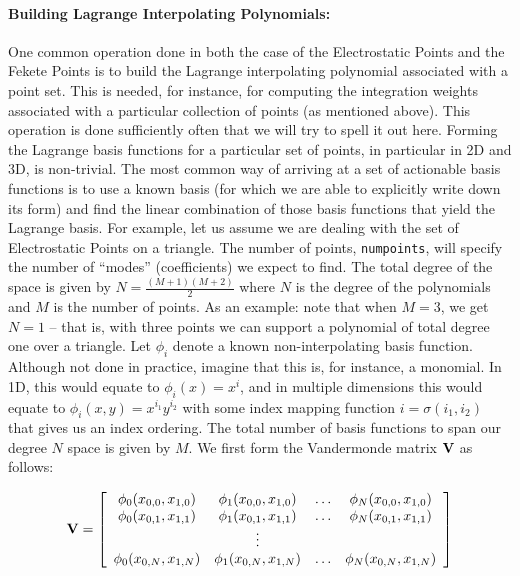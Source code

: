 \paragraph{Building Lagrange Interpolating Polynomials: }
One common operation done in both the case of the Electrostatic Points and the Fekete Points is to build the
Lagrange interpolating polynomial associated with a point set.  This is needed, for instance, for computing the integration
weights associated with a particular collection of points (as mentioned above).  This 
operation is done sufficiently often that we will try to spell it out here.  Forming the Lagrange basis functions for a particular
set of points, in particular in 2D and 3D, is non-trivial.  The most common way of arriving at a set of actionable basis functions is
to use a known basis (for which we are able to explicitly write down its form) 
and find the linear combination of those basis functions that yield the Lagrange basis.  For example, let us
assume we are dealing with the set of Electrostatic Points on a triangle.  The number of points, \verb+numpoints+, will
specify the number of ``modes'' (coefficients) we expect to find.  The total degree of the space is given by $N = \frac{(M+1)(M+2)}{2}$
where $N$ is the degree of the polynomials and $M$ is the number of points.  As an example: 
note that when $M=3$, we get $N=1$ -- that is, with three points we can support a polynomial of total 
degree one over a triangle.  Let $\phi_i$ denote a known non-interpolating basis function.  Although not
done in practice, imagine that this is, for instance, a monomial.  In 1D, this would equate to $\phi_i(x) = x^i$, and in
multiple dimensions this would equate to $\phi_i(x,y) = x^{i_1}y^{i_2}$ with some index mapping function $i=\sigma(i_1,i_2)$
that gives us an index ordering.  The total number of basis functions to span our degree $N$ space is given by $M$.
We first form the Vandermonde matrix ${\bf V}$ as follows:


\[
 {\bf V} =  \left[ {\begin{array}{cccc}
   \phi_0(x_{0,0},x_{1,0}) & \phi_1(x_{0,0},x_{1,0}) & \ldots & \phi_N(x_{0,0},x_{1,0}) \\
   \phi_0(x_{0,1},x_{1,1}) & \phi_1(x_{0,1},x_{1,1}) & \ldots & \phi_N(x_{0,1},x_{1,1}) \\
                                        & \vdots & & \\
   \phi_0(x_{0,N},x_{1,N}) & \phi_1(x_{0,N},x_{1,N}) & \ldots & \phi_N(x_{0,N},x_{1,N}) \\
  \end{array} } \right]
\]

